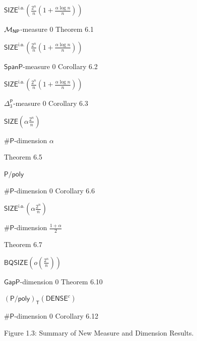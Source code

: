 \documentclass[10pt,a4paper]{article}
\begin{document}
$\mathsf{SIZE}^{\mathsf{i.o.}}\!\!\left(\frac{2^{n}}{n}\!\left(1+\frac{\alpha\log n}{n}\right)\right)$ 

${{\cal M}_{\mathsf{NP}}}$-measure 0 
Theorem 6.1
 
\par




$\mathsf{SIZE}^{\mathsf{i.o.}}\!\!\left(\frac{2^{n}}{n}\!\left(1+\frac{\alpha\log n}{n}\right)\right)$ 

$\mathsf{SpanP}$-measure 0 
Corollary 6.2
 
\par


$\mathsf{SIZE}^{\mathsf{i.o.}}\!\!\left(\frac{2^{n}}{n}\!\left(1+\frac{\alpha\log n}{n}\right)\right)$ 

${\Delta^{\mathsf{P}}_{3}}$-measure 0 
Corollary 6.3
 
\par


$\mathsf{SIZE}\!\left(\alpha\frac{2^{n}}{n}\right)$ 

${\mathsf{\#}\mathsf{P}}$-dimension $\alpha$
 
Theorem 6.5
 
\par


${\mathsf{P}/\mathsf{poly}}$ 

${\mathsf{\#}\mathsf{P}}$-dimension 0 
Corollary 6.6
 
\par


$\mathsf{SIZE}^{\mathsf{i.o.}}\!\!\left(\alpha\frac{2^{n}}{n}\right)$ 

${\mathsf{\#}\mathsf{P}}$-dimension $\frac{1+\alpha}{2}$
 
Theorem 6.7
 
\par


$\mathsf{BQSIZE}\left(o\left(\frac{2^{n}}{n}\right)\right)$ 

$\mathsf{GapP}$-dimension 0 
Theorem 6.10
 
\par


$({\mathsf{P}/\mathsf{poly}})_{\mathsf{T}}(\mathsf{DENSE}^{c})$ 

${\mathsf{\#}\mathsf{P}}$-dimension 0 
Corollary 6.12
 
\par




Figure 1.3: Summary of New Measure and Dimension Results.
\end{document}
